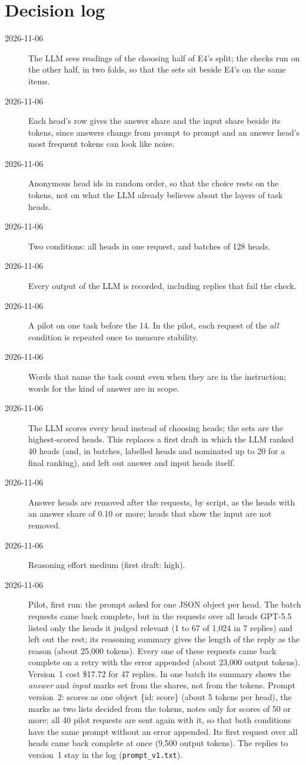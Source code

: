 \documentclass[11pt,a4paper]{article}
\begin{document}
\section*{Decision log}\label{app:decisions}
\begin{description}
  \item[2026-11-06] The LLM sees readings of the choosing half of E4's split; the checks run on the other half, in two folds, so that the sets sit beside E4's on the same items.
  \item[2026-11-06] Each head's row gives the answer share and the input share beside its tokens, since answers change from prompt to prompt and an answer head's most frequent tokens can look like noise.
  \item[2026-11-06] Anonymous head ids in random order, so that the choice rests on the tokens, not on what the LLM already believes about the layers of task heads.
  \item[2026-11-06] Two conditions: all heads in one request, and batches of 128 heads.
  \item[2026-11-06] Every output of the LLM is recorded, including replies that fail the check.
  \item[2026-11-06] A pilot on one task before the 14. In the pilot, each request of the \emph{all} condition is repeated once to measure stability.
  \item[2026-11-06] Words that name the task count even when they are in the instruction; words for the kind of answer are in scope.
  \item[2026-11-06] The LLM scores every head instead of choosing heads; the sets are the highest-scored heads. This replaces a first draft in which the LLM ranked 40 heads (and, in batches, labelled heads and nominated up to 20 for a final ranking), and left out answer and input heads itself.
  \item[2026-11-06] Answer heads are removed after the requests, by script, as the heads with an answer share of 0.10 or more; heads that show the input are not removed.
  \item[2026-11-06] Reasoning effort medium (first draft: high).
  \item[2026-11-06] Pilot, first run: the prompt asked for one JSON object per head. The batch requests came back complete, but in the requests over all heads GPT-5.5 listed only the heads it judged relevant (1 to 67 of 1{,}024 in 7 replies) and left out the rest; its reasoning summary gives the length of the reply as the reason (about 25{,}000 tokens). Every one of these requests came back complete on a retry with the error appended (about 23{,}000 output tokens). Version~1 cost \$17.72 for 47 replies. In one batch its summary shows the \emph{answer} and \emph{input} marks set from the shares, not from the tokens. Prompt version~2: scores as one object \{id: score\} (about 5 tokens per head), the marks as two lists decided from the tokens, notes only for scores of 50 or more; all 40 pilot requests are sent again with it, so that both conditions have the same prompt without an error appended. Its first request over all heads came back complete at once (9{,}500 output tokens). The replies to version~1 stay in the log (\texttt{prompt\_v1.txt}).

\end{description}
\end{document}
